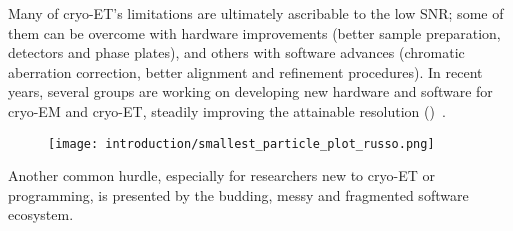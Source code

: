 Many of cryo-ET's limitations are ultimately ascribable to the low SNR; some of them can be overcome with hardware improvements (better sample preparation, detectors and phase plates), and others with software advances (chromatic aberration correction, better alignment and refinement procedures).
In recent years, several groups are working on developing new hardware and software for cryo-EM and cryo-ET, steadily improving the attainable resolution ()~\cite{russoCryomicroscopySituWhat2022}.

\begin{figure}[!ht]
    \centering
    \texttt{[image: introduction/smallest\_particle\_plot\_russo.png]}
    \label{fig:et_smallest_particle}
\end{figure}

Another common hurdle, especially for researchers new to cryo-ET or programming, is presented by the budding, messy and fragmented software ecosystem.
